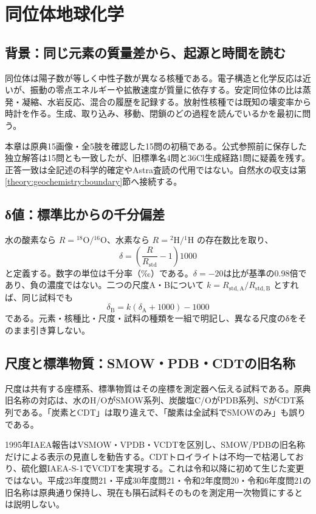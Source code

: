 \chapter{同位体地球化学}
\section{背景：同じ元素の質量差から、起源と時間を読む}
\label{theory:isotope:boundary}
同位体は陽子数が等しく中性子数が異なる核種である。電子構造と化学反応は近いが、振動の零点エネルギーや拡散速度が質量に依存する。安定同位体の比は蒸発・凝縮、水岩反応、混合の履歴を記録する。放射性核種では既知の壊変率から時計を作る。生成、取り込み、移動、閉鎖のどの過程を読んでいるかを最初に問う。

本章は原典15画像・全5肢を確認した15問の初稿である。公式参照前に保存した独立解答は15問とも一致したが、旧標準名4問と36Cl生成経路1問に疑義を残す。正答一致は全記述の科学的確定やAstra査読の代用ではない。自然水の収支は第\ref{theory:geochemistry:boundary}節へ接続する。

\section{δ値：標準比からの千分偏差}
\label{theory:isotope:delta}
水の酸素なら \(R={}^{18}\mathrm O/{}^{16}\mathrm O\)、水素なら \(R={}^{2}\mathrm H/{}^{1}\mathrm H\) の存在数比を取り、
\[
 \delta=\left(\frac{R}{R_{\mathrm{std}}}-1\right)1000
\]
と定義する。数字の単位は千分率（‰）である。\(\delta=-20\)は比が基準の0.98倍であり、負の濃度ではない。二つの尺度A・Bについて \(k=R_{\mathrm{std,A}}/R_{\mathrm{std,B}}\) とすれば、同じ試料でも
\[
 \delta_{\mathrm B}=k(\delta_{\mathrm A}+1000)-1000
\]
である。元素・核種比・尺度・試料の種類を一組で明記し、異なる尺度のδをそのまま引き算しない\cite{iso_standards1995,iso_vsmow2}。

\section{尺度と標準物質：SMOW・PDB・CDTの旧名称}
\label{theory:isotope:standards}
尺度は共有する座標系、標準物質はその座標を測定器へ伝える試料である。原典旧名称の対応は、水のH/OがSMOW系列、炭酸塩C/OがPDB系列、SがCDT系列である。「炭素とCDT」は取り違えで、「酸素は全試料でSMOWのみ」も誤りである。

\begin{tcolorbox}[title=出題前から存在した尺度の区別]
1995年IAEA報告はVSMOW・VPDB・VCDTを区別し、SMOW/PDBの旧名称だけによる表示の見直しを勧告する。CDTトロイライトは不均一で枯渇しており、硫化銀IAEA-S-1でVCDTを実現する。これは令和以降に初めて生じた変更ではない。平成23年度問21・平成30年度問21・令和2年度問20・令和6年度問21の旧名称は原典通り保持し、現在も隕石試料そのものを測定用一次物質にするとは説明しない\cite{iso_standards1995,iso_vcdt}。
\end{tcolorbox}

